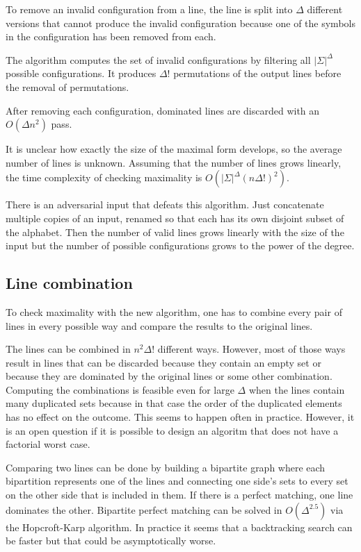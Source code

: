 \documentclass[english, 12pt, a4paper, sci, a-1b, online]{aaltothesis}
\begin{document}
To remove an invalid configuration from a line, the line is split into $\Delta$ different versions that cannot produce the invalid configuration because one of the symbols in the configuration has been removed from each.

The algorithm computes the set of invalid configurations by filtering all $|\Sigma|^{\Delta}$ possible configurations. It produces $\Delta!$ permutations of the output lines before the removal of permutations.

After removing each configuration, dominated lines are discarded with an $O(\Delta n^2)$ pass.

It is unclear how exactly the size of the maximal form develops, so the average number of lines is unknown. Assuming that the number of lines grows linearly, the time complexity of checking maximality is $O(|\Sigma|^{\Delta}{(n\Delta!)}^2)$.

There is an adversarial input that defeats this algorithm. Just concatenate multiple copies of an input, renamed so that each has its own disjoint subset of the alphabet. Then the number of valid lines grows linearly with the size of the input but the number of possible configurations grows to the power of the degree.

\subsection{Line combination}

To check maximality with the new algorithm, one has to combine every pair of lines in every possible way and compare the results to the original lines.

The lines can be combined in $n^2\Delta!$ different ways. However, most of those ways result in lines that can be discarded because they contain an empty set or because they are dominated by the original lines or some other combination. Computing the combinations is feasible even for large $\Delta$ when the lines contain many duplicated sets because in that case the order of the duplicated elements has no effect on the outcome. This seems to happen often in practice. However, it is an open question if it is possible to design an algoritm that does not have a factorial worst case.

Comparing two lines can be done by building a bipartite graph where each bipartition represents one of the lines and connecting one side's sets to every set on the other side that is included in them. If there is a perfect matching, one line dominates the other. Bipartite perfect matching can be solved in $O(\Delta^{2.5})$ via the Hopcroft-Karp algorithm. In practice it seems that a backtracking search can be faster but that could be asymptotically worse.
\end{document}
